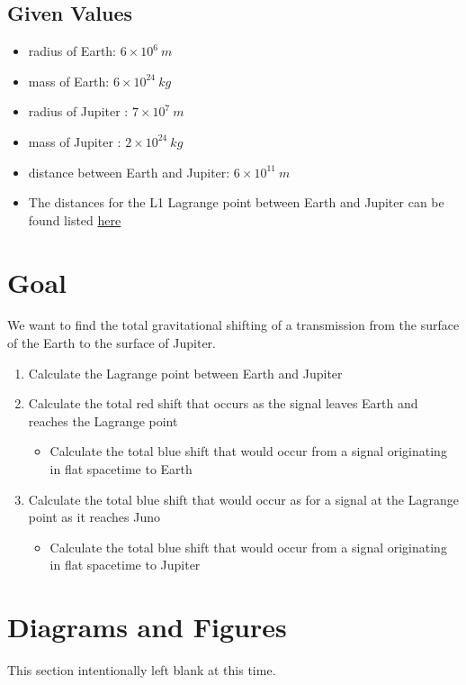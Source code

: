 \documentclass[]{report}
\begin{document}
      \subsection{Given Values}
        \begin{itemize}
          \item radius of Earth: $6\times10^{6}\ m$
          \item mass of Earth: $6\times10^{24}\ kg$
          \item radius of Jupiter : $7\times10^{7}\ m$
          \item mass of Jupiter : $2\times10^{24}\ kg$
          \item distance between Earth and Jupiter: $6\times10^{11}\ m$
          \item The distances for the L1 Lagrange point between Earth and Jupiter can be found listed  \href{https://www.wolframalpha.com/input/?i=lagrange+point+Earth+and+Jupiter}{here}
          \end{itemize}

    \section{Goal}
      We want to find the total gravitational shifting of a transmission from the surface of the Earth to the surface of Jupiter.

      \begin{enumerate}
       \item Calculate the Lagrange point between Earth and Jupiter
       \item Calculate the total red shift that occurs as the signal leaves Earth and reaches the Lagrange point
       \begin{itemize}
         \item Calculate the total blue shift that would occur from a signal originating in flat spacetime to Earth
        \end{itemize}
       \item Calculate the total blue shift that would occur as for a signal at the Lagrange point as it reaches Juno
       \begin{itemize}
         \item Calculate the total blue shift that would occur from a signal originating in flat spacetime to Jupiter
         \end{itemize}
        \end{enumerate}

    \section{Diagrams and Figures}
      This section intentionally left blank at this time.
\end{document}

